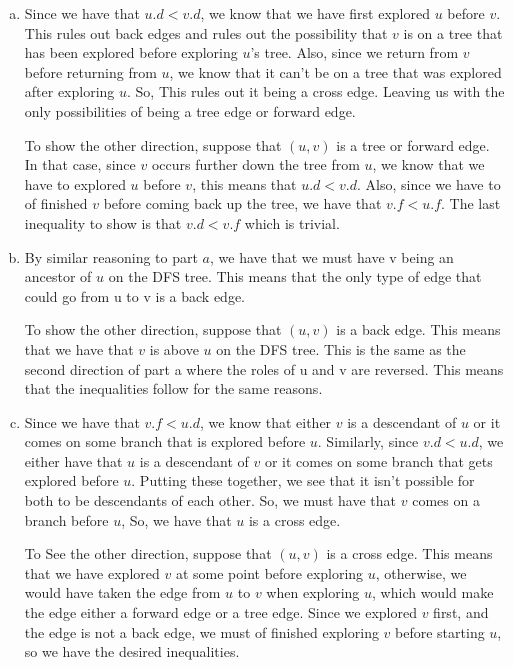 \documentclass{article}
\begin{document}
\begin{enumerate}[a.]
\item
Since we have that $u.d < v.d$, we know that we have first explored $u$ before $v$. This rules out back edges and rules out the possibility that $v$ is on a tree that has been explored before exploring $u$'s tree. Also, since we return from $v$ before returning from $u$, we know that it can't be on a tree that was explored after exploring $u$. So, This rules out it being a cross edge. Leaving us with the only possibilities of being a tree edge or forward edge.

To show the other direction, suppose that $(u,v)$ is a tree or forward edge. In that case, since $v$ occurs further down the tree from $u$, we know that we have to explored $u$ before $v$, this means that $u.d< v.d$. Also, since we have to of finished $v$ before coming back up the tree, we have that $v.f<u.f$. The last inequality to show is that $v.d < v.f$ which is trivial.
\item
By similar reasoning to part $a$, we have that we must have v being an ancestor of $u$ on the DFS tree. This means that the only type of edge that could go from u to v is a back edge.

To show the other direction, suppose that $(u,v)$ is a back edge. This means that we have that $v$ is above $u$ on the DFS tree. This is the same as the second direction of part a where the roles of u and v are reversed. This means that the inequalities follow for the same reasons.


\item
Since we have that $v.f < u.d$, we know that either $v$ is a descendant of $u$ or it comes on some branch that is explored before $u$. Similarly, since $v.d < u.d$, we either have that $u$ is a descendant of $v$ or it comes on some branch that gets explored before $u$. Putting these together, we see that it isn't possible for both to be descendants of each other. So, we must have that $v$ comes on a branch before $u$, So, we have that $u$ is a cross edge.

To See the other direction, suppose that $(u,v)$ is a cross edge. This means that we have explored $v$ at some point before exploring $u$, otherwise, we would have taken the edge from $u$ to $v$ when exploring $u$, which would make the edge either a forward edge or a tree edge. Since we explored $v$ first, and the edge is not a back edge, we must of finished exploring $v$ before starting $u$, so we have the desired inequalities.


\end{enumerate}
\end{document}
